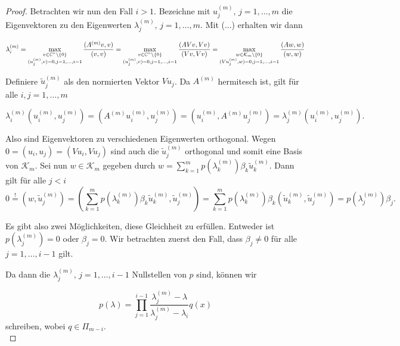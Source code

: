 \documentclass{article}
\begin{document}
\begin{theorem}
\begin{proof}
	Betrachten wir nun den Fall $i>1$.
	Bezeichne mit $u_j^{(m)}, \, j = 1,\dots, m$ die Eigenvektoren zu den Eigenwerten $\lambda_j^{(m)} , \, j = 1,\dots, m$. Mit (...) erhalten wir dann
	
	\begin{equation*}
		\lambda_i^{(m)} = \max_{\substack{v\in \mathbb{C}^n\setminus \{0\} \\ (u_j^{(m)},v) = 0, j = 1,\dots,i-1}} \frac{(A^{(m)}v,v)}{(v,v)} = \max_{\substack{v\in \mathbb{C}^n\setminus \{0\} \\ (u_j^{(m)},v) = 0, j = 1,\dots,i-1}} \frac{(AVv,Vv)}{(Vv,Vv)} = \max_{\substack{w\in \mathcal{K}_m\setminus \{0\} \\ (Vu_j^{(m)},w) = 0, j = 1,\dots,i-1}} \frac{(Aw,w)}{(w,w)}
	\end{equation*}
	
	
	Definiere  $\tilde{u}_j^{(m)}$ als den normierten Vektor $Vu_j$. Da $A^{(m)}$ hermitesch ist, gilt für alle $i,j = 1,\dots, m$
	 
	\begin{equation*}
		\lambda^{(m)}_i (u_i^{(m)}, u_j^{(m)}) = (A^{(m)}u_i^{(m)}, u_j^{(m)}) = (u_i^{(m)}, A^{(m)}u_j^{(m)}) = \lambda^{(m)}_j (u_i^{(m)}, u_j^{(m)}).
	\end{equation*}
	
	Also sind Eigenvektoren zu verschiedenen Eigenwerten orthogonal. Wegen $ 0 = (u_i, u_j) = (Vu_i, Vu_j)$ sind auch die $\tilde{u}_j^{(m)}$ orthogonal und somit eine Basis von $\mathcal{K}_m$. Sei nun $w\in \mathcal{K}_m$ gegeben durch $w = \sum_{k=1}^{m} p(\lambda_k^{(m)}) \beta_k \tilde{u}_k^{(m)}$. Dann gilt für alle $j < i$
	\begin{equation*}
		0 \stackrel{!}{=} (w,\tilde{u}_j^{(m)}) = (\sum_{k=1}^{m} p(\lambda_k^{(m)}) \beta_k \tilde{u}_k^{(m)},\tilde{u}_j^{(m)}) = \sum_{k=1}^{m} p(\lambda_k^{(m)}) \beta_k (\tilde{u}_k^{(m)},\tilde{u}_j^{(m)}) = p(\lambda_j^{(m)}) \beta_j.
	\end{equation*}

	Es gibt also zwei Möglichkeiten, diese Gleichheit zu erfüllen. Entweder ist $p(\lambda_j^{(m)}) = 0$ oder $\beta_j = 0$. Wir betrachten zuerst den Fall, dass  $\beta_j \neq 0$ für alle $j = 1,\dots, i-1$ gilt.
	
	Da dann die $\lambda_j^{(m)}, \, j = 1,\dots,i-1$ Nullstellen von $p$ sind, können wir
	
	\begin{equation*}
		p(\lambda) = \prod_{j = 1}^{i-1} \frac{\lambda_j^{(m)} -\lambda}{\lambda_j^{(m)} - \lambda_i} q(x)
	\end{equation*}
	schreiben, wobei $q \in \Pi_{m-i}$.\\
	

\end{proof}
\end{theorem}
\end{document}
